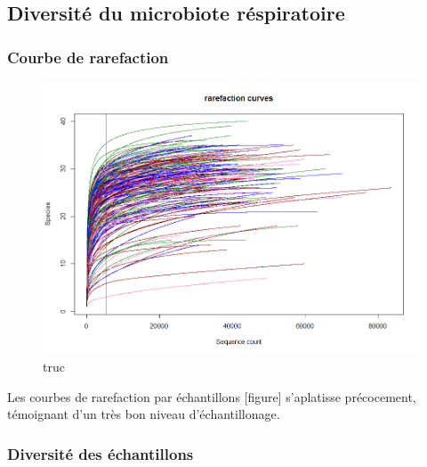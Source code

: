 \documentclass[12pt,a4paper]{article}
\begin{document}
\subsection{Diversité du microbiote réspiratoire}

\subsubsection{Courbe de rarefaction}


\begin{figure}[!ht]
\begin{center}
\includegraphics[scale=0.5]{img/rarefaction.png}\hfill
\end{center}
\caption{truc}
\label{bach}
\end{figure}




Les courbes de rarefaction par échantillons [figure] s’aplatisse précocement, témoignant d’un très bon niveau d’échantillonage.

\subsubsection{Diversité des échantillons}
\end{document}
